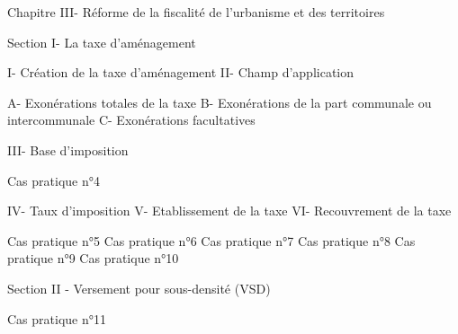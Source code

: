 Chapitre III- Réforme de la fiscalité de l’urbanisme et des territoires 

	Section I- La taxe d’aménagement 

I- Création de la taxe d’aménagement 
II- Champ d’application 

			A- Exonérations totales de la taxe 
			B- Exonérations de la part communale ou intercommunale 
			C- Exonérations facultatives 

		III- Base d’imposition 
		
		Cas pratique n°4

		IV- Taux d’imposition
		V- Etablissement de la taxe 
		VI- Recouvrement de la taxe 

		Cas pratique n°5
		Cas pratique n°6
		Cas pratique n°7
		Cas pratique n°8
		Cas pratique n°9
		Cas pratique n°10

Section II - Versement pour sous-densité (VSD) 

Cas pratique n°11
